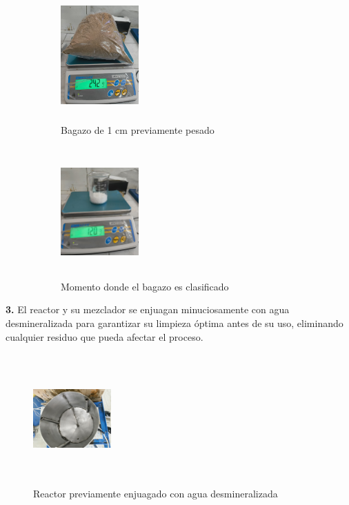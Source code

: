 \documentclass[12pt]{article}
\begin{document}
			\begin{figure} [H]
				\centering
				\begin{subfigure}[b]{0.45\textwidth}
					\centering
					\includegraphics[width=3cm, height=5cm]{imagenes/pesado4}
					\caption{Bagazo de 1 cm previamente pesado}
					\label{bagazo1}
				\end{subfigure}
				\hfill %
				\begin{subfigure}[b]{0.45\textwidth}
					\centering
					\includegraphics[width=3cm, height=5cm]{imagenes/hidroxido_pesado}
					\caption{Momento donde el bagazo es clasificado}
					\label{cernir_bagazo_hidroxidopesado}
				\end{subfigure}
				\caption{}
				\label{fig:de}
			\end{figure}
			\textbf{3.} El reactor y su mezclador se enjuagan minuciosamente con agua desmineralizada para garantizar su limpieza óptima antes de su uso, eliminando cualquier residuo que pueda afectar el proceso.
			\begin{figure} [H]
				\centering
				\includegraphics[width=3cm, height=5cm,angle=90]{imagenes/reactor limpio}
				\caption{Reactor previamente enjuagado con agua desmineralizada}
				\label{reactor limpio}
			\end{figure}
		
\end{document}
